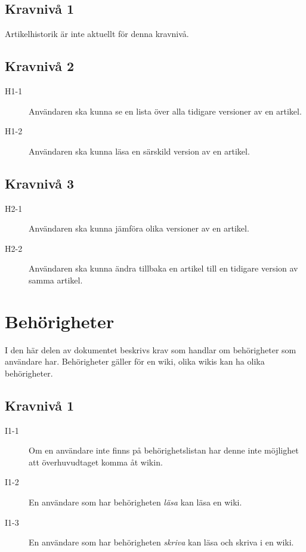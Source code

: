 \subsection{Kravnivå 1}
Artikelhistorik är inte aktuellt för denna kravnivå.

\subsection{Kravnivå 2}
\begin{description}
\item[H1-1] Användaren ska kunna se en lista över alla tidigare versioner av en artikel.
\item[H1-2] Användaren ska kunna läsa en särskild version av en artikel.
\end{description}

\subsection{Kravnivå 3}
\begin{description}
\item[H2-1] Användaren ska kunna jämföra olika versioner av en artikel.
\item[H2-2] Användaren ska kunna ändra tillbaka en artikel till en tidigare version av samma artikel.
\end{description}

\section{Behörigheter}
I den här delen av dokumentet beskrivs krav som handlar om behörigheter som användare har. Behörigheter gäller för en wiki, olika wikis kan ha olika behörigheter.

\subsection{Kravnivå 1}
\begin{description}
\item[I1-1] Om en användare inte finns på behörighetslistan har denne inte möjlighet att överhuvudtaget komma åt wikin.
\item[I1-2] En användare som har behörigheten \emph{läsa} kan läsa en wiki.
\item[I1-3] En användare som har behörigheten \emph{skriva} kan läsa och skriva i en wiki.
\end{description}

